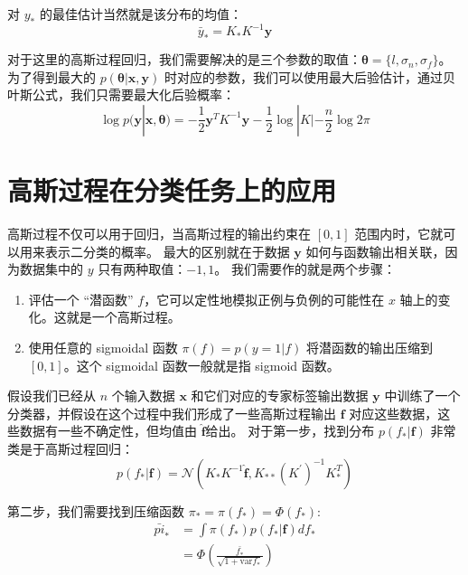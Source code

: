 \documentclass[degree=project, degree-type=project]{thuthesis}
\begin{document}
对 $y_*$ 的最佳估计当然就是该分布的均值：
\begin{equation}
\bar{y}_* = K_* K^{-1}\boldsymbol{y}
\end{equation}

对于这里的高斯过程回归，我们需要解决的是三个参数的取值：$\boldsymbol{\theta} = \{l, \sigma_n, \sigma_f\}$。
为了得到最大的 $p(\boldsymbol{\theta}| \boldsymbol{x}, \boldsymbol{y})$ 时对应的参数，我们可以使用最大后验估计，通过贝叶斯公式，我们只需要最大化后验概率：
\begin{equation}
\log p(\boldsymbol{y}|\boldsymbol{x},\boldsymbol{\theta}) = -\frac{1}{2} \boldsymbol{y}^T K^{-1} \boldsymbol{y} - \frac{1}{2} \log |K| - \frac{n}{2} \log 2\pi
\end{equation}

\section{高斯过程在分类任务上的应用}

高斯过程不仅可以用于回归，当高斯过程的输出约束在 $[0,1]$ 范围内时，它就可以用来表示二分类的概率。
最大的区别就在于数据 $\boldsymbol{y}$ 如何与函数输出相关联，因为数据集中的 $y$ 只有两种取值：$-1, 1$。
我们需要作的就是两个步骤：
\begin{enumerate}
	\item 评估一个 “潜函数” $f$，它可以定性地模拟正例与负例的可能性在 $x$ 轴上的变化。这就是一个高斯过程。
	\item 使用任意的 sigmoidal 函数 $\pi(f) = p(y=1|f)$ 将潜函数的输出压缩到 $[0,1]$。这个 sigmoidal 函数一般就是指 sigmoid 函数。
\end{enumerate}

假设我们已经从 $n$ 个输入数据 $\boldsymbol{x}$ 和它们对应的专家标签输出数据 $\boldsymbol{y}$ 中训练了一个分类器，并假设在这个过程中我们形成了一些高斯过程输出 $\boldsymbol{f}$ 对应这些数据，这些数据有一些不确定性，但均值由 $\hat{\boldsymbol{f}}$给出。
对于第一步，找到分布 $p(f_* | \boldsymbol{f})$ 非常类是于高斯过程回归：
\begin{equation}
p(f_*|\boldsymbol{f}) = \mathcal{N}(K_*K^{-1}\hat{\boldsymbol{f}}, K_{**}(K^\prime)^{-1}K_*^T)
\end{equation}

第二步，我们需要找到压缩函数 $\pi_* = \pi(f_*) = \Phi(f_*)$:
\begin{align}
\bar{pi}_* &= \int \pi(f_*) p(f_*|\boldsymbol{f})df_* \\
	&= \Phi(\frac{\bar{f_*}}{\sqrt{1 + \text{var}{f_*}}})
\end{align}
\end{document}
